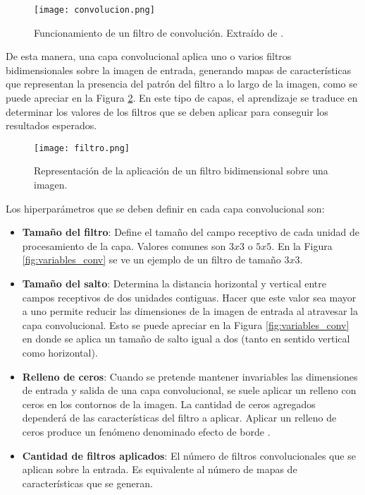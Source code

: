 \begin{figure}[H]
  \centering{}
  \texttt{[image: convolucion.png]}
  \caption{Funcionamiento de un filtro de convolución. Extraído de \cite{dragon}.}
  \label{fig:convolucion}
\end{figure}

De esta manera, una capa convolucional aplica uno o varios filtros bidimensionales sobre la imagen de entrada, generando mapas de características que representan la presencia del patrón del filtro a lo largo de la imagen, como se puede apreciar en la Figura \ref{fig:numerito}. En este tipo de capas, el aprendizaje se traduce en determinar los valores de los filtros que se deben aplicar para conseguir los resultados esperados. 

\begin{figure}[H]
  \centering{}
  \texttt{[image: filtro.png]}
  \caption{Representación de la aplicación de un filtro bidimensional sobre una imagen.}
  \label{fig:numerito}
\end{figure}

Los hiperparámetros que se deben definir en cada capa convolucional son: 

\begin{itemize}
\item\textbf{Tamaño del filtro}: Define el tamaño del campo receptivo de cada unidad de procesamiento de la capa. Valores comunes son $3x3$ o $5x5$. En la Figura \ref{fig:variables_conv} se ve un ejemplo de un filtro de tamaño $3x3$.

\item\textbf{Tamaño del salto}: Determina la distancia horizontal y vertical entre campos receptivos de dos unidades contiguas. Hacer que este valor sea mayor a uno permite reducir las dimensiones de la imagen de entrada al atravesar la capa convolucional. Esto se puede apreciar en la Figura \ref{fig:variables_conv} en donde se aplica un tamaño de salto igual a dos (tanto en sentido vertical como horizontal). 

\item\textbf{Relleno de ceros}: Cuando se pretende mantener invariables las dimensiones de entrada y salida de una capa convolucional, se suele aplicar un relleno con ceros en los contornos de la imagen. La cantidad de ceros agregados dependerá de las características del filtro a aplicar. Aplicar un relleno de ceros produce un fenómeno denominado efecto de borde \cite{lagartija}. 

\item\textbf{Cantidad de filtros aplicados}: El número de filtros convolucionales que se aplican sobre la entrada. Es equivalente al número de mapas de características que se generan. 

\end{itemize}

